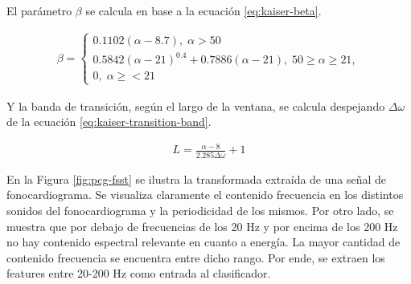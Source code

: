 \indent El parámetro $\beta$ se calcula en base a la ecuación \ref{eq:kaiser-beta}.

\begin{align} \label{eq:kaiser-beta}
    \beta = \begin{cases}
                0.1102(\alpha-8.7), \; \alpha > 50 \\
                0.5842(\alpha-21)^{0.4}+0.7886(\alpha-21), \; 50 \geq \alpha \geq 21, \\
                0, \; \alpha \geq < 21
            \end{cases}
\end{align}

Y la banda de transición, según el largo de la ventana, se calcula despejando $\Delta\omega$ de la ecuación \ref{eq:kaiser-transition-band}.

\begin{align} \label{eq:kaiser-transition-band}
    L = \frac{\alpha-8}{2.285\Delta\omega} + 1
\end{align}

\indent En la Figura \ref{fig:pcg-fsst} se ilustra la transformada extraída de una señal de fonocardiograma. Se visualiza claramente el contenido frecuencia en los distintos sonidos del fonocardiograma y la periodicidad de los mismos. Por otro lado, se muestra que por debajo de frecuencias de los 20 Hz y por encima de los 200 Hz no hay contenido espectral relevante en cuanto a energía. La mayor cantidad de contenido frecuencia se encuentra entre dicho rango. Por ende, se extraen los features entre 20-200 Hz como entrada al clasificador. 

